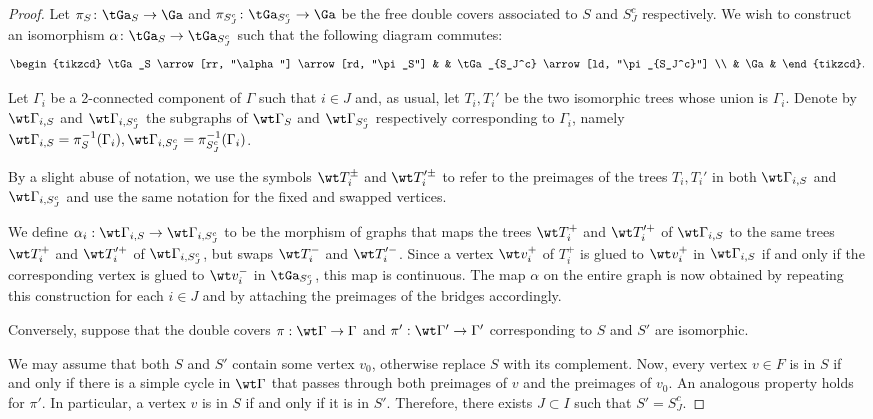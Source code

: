{    \begin{proof}
        Let $\pi_{S}\colon \tGa_S\to \Ga$ and $\pi_{S_J^c}\colon \tGa_{S_J^c}\to \Ga$ be the free double covers associated to $S$ and $S_J^c$ respectively. 
        We wish to construct an isomorphism $\alpha\colon  \tGa_S\to \tGa_{S_J^c}$ such that the following diagram commutes: 
        \[
\begin{tikzcd}
\tGa_S \arrow[rr, "\alpha"] \arrow[rd, "\pi_S"] &      & \tGa_{S_J^c} \arrow[ld, "\pi_{S_J^c}"] \\
                              & \Ga&                
\end{tikzcd}.
        \]

 Let $\Gamma_i$ be a 2-connected component of $\Gamma$ such that $i\in J$ and,  as usual, let $T_i,T_i'$ be the two  isomorphic trees whose union is $\Gamma_i$. Denote by $\wt\Gamma_{i,S}$ and $\wt\Gamma_{i,S_J^c}$ the subgraphs of $\wt\Gamma_S$ and $\wt\Gamma_{S_J^c}$ respectively corresponding to $\Gamma_i$, namely
 $\wt\Gamma_{i,S} = \pi_{S}^{-1}(\Gamma_i), \wt\Gamma_{i,S_J^c} = \pi_{S_J^c}^{-1}(\Gamma_i)$.
 
        By a slight abuse of notation, we use the  symbols $\wt T_i^{\pm}$ and $\wt T_i'^{\pm}$ to refer to the preimages of the trees $T_i, T_i'$
        in both
        $\wt\Gamma_{i,S}$ and $\wt\Gamma_{i,S_J^c}$ and use the same notation for the fixed and swapped vertices.  
    
        We define $\alpha_i:\wt\Gamma_{i,S}\to\wt\Gamma_{i,S_J^c}$  to be the morphism of graphs that maps the trees $\wt T_i^+$ and $\wt T_i'^+$ of $\wt\Gamma_{i,S}$ to the same trees $\wt T_i^+$ and $\wt T_i'^+$ of $\wt\Gamma_{i,S_J^c}$, but 
        swaps $\wt T_i^-$ and $\wt T_i'^-$.
        Since a vertex $\wt v_i^+$ of $T_i^+$ is glued to $\wt v_i^+$ in $\wt\Gamma_{i,S}$ if and only if 
        the corresponding vertex  is glued to $\wt v_i^-$ in  $\tGa_{S_J^c}$, this map is continuous. 
The map $\alpha$ on the entire graph is now obtained      by repeating this construction for each $i\in J$ and by attaching the preimages of the bridges accordingly. 
            
Conversely, suppose that the double covers $\pi:\wt\Gamma\to\Gamma$ and $\pi':\wt\Gamma'\to\Gamma'$ corresponding to $S$ and $S'$ are isomorphic.
 
We may assume that both $S$ and $S'$ contain some vertex $v_0$, otherwise replace $S$ with its complement.  Now,  every vertex $v\in F$ is  in $S$ if and only if there is a simple cycle in $\wt\Gamma$ that passes through both  preimages of $v$ and the preimages of $v_0$.  An analogous property holds for $\pi'$. In particular, a vertex $v$ is in $S$ if and only if it is in $S'$. 
Therefore, there exists $J\subset I$ such that $S'=S^c_{J}$.
    \end{proof}

}
